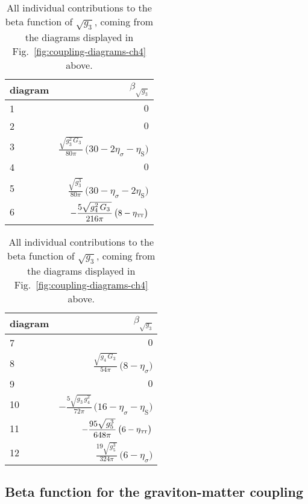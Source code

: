 \documentclass[11pt]{book}
\newcommand\TTspace{ -1pt }
\newcommand\etaTT{ \eta_{\scriptscriptstyle{\mathrm{T\hspace{\TTspace}T}}} }
\newcommand\etaS{ \eta_{\scriptscriptstyle{\mathrm{S}}} }
\numberwithin{equation}{chapter}
\begin{document}
{
  \setlength{\extrarowheight}{10pt}
  \begin{table}[p]
    \begin{center}
      \begin{tabular}{ l r }
        \toprule
        diagram &  $\beta_{\sqrt{g_3}}$ \\
        \midrule
         1 &  $\displaystyle 0$ \\
         2 &  $\displaystyle 0$ \\
         3 &  $\displaystyle \frac{\sqrt{g_3^2 \, G_3 \,}}{80\pi} \, \big( 30 - 2\eta_\sigma - \etaS \big)$ \\
         4 &  $\displaystyle 0$ \\
         5 &  $\displaystyle \frac{\sqrt{g_3^3 \,}}{80 \pi} \, \big( 30 -\eta_\sigma - 2 \etaS \big)$ \\
         6 &  $\displaystyle -\frac{5 \sqrt{g_4^2 \, G_3 \,}}{216 \pi}  \, \big( 8 - \etaTT \big)$ \\
        \bottomrule
      \end{tabular}
      \hspace{3mm}
      \begin{tabular}{ l r }
        \toprule
        diagram &  $\beta_{\sqrt{g_3}}$ \\
        \midrule
         7 & $\displaystyle 0$ \\
         8 & $\displaystyle \frac{\sqrt{g_4 \, G_3 \,}}{54 \pi} \, \big( 8 - \eta_\sigma \big)$ \\
         9 & $\displaystyle 0$ \\
        10 & $\displaystyle -\frac{5 \sqrt{g_3 \, g_4^2 \,}}{72 \pi} \, \big( 16 - \eta_\sigma - \etaS \big)$ \\
        11 & $\displaystyle -\frac{95 \sqrt{g_5^3 \,}}{648 \pi} \, \big( 6 - \etaTT \big)$ \\
        12 & $\displaystyle \frac{19 \sqrt{g_5^3\,}}{324 \pi} \, \big( 6 - \eta_\sigma \big)$ \\
        \bottomrule
      \end{tabular}
    \end{center}
    \caption[Coordinates and critical exponents of fixed points in perturbative approximation]
    {
      All individual contributions to the beta function of $\sqrt{g_3}$,
      coming from the diagrams displayed in Fig.~\ref{fig:coupling-diagrams-ch4} above.
    }
    \label{tab:coupling-diagrams-ch4}
  \end{table}
}


\subsection{Beta function for the graviton-matter coupling}
\end{document}

